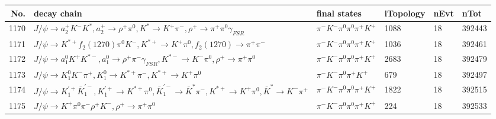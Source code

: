 \begin{table}[htbp] 
\begin{center}
\begin{small}
\begin{tabular}{rlllll}\hline\hline
 No. & decay chain & final states &  iTopology & nEvt & nTot \\\hline
1170&$J/\psi       \rightarrow a_{2}^{+}      K^{-}          K^{*}          , a_{2}^{+}       \rightarrow \rho^{+}      \pi^{0}        , K^{*}           \rightarrow K^{+}          \pi^{-}        , \rho^{+}       \rightarrow \pi^{+}        \pi^{0}        \gamma_{FSR} $&$\pi^{-}        K^{-}          \pi^{0}        \pi^{0}        \pi^{+}        K^{+}          $& 1088&   18&392443\\
1171&$J/\psi       \rightarrow K^{*+}         f_{2}(1270)    \pi^{0}        K^{-}          , K^{*+}          \rightarrow K^{+}          \pi^{0}        , f_{2}(1270)     \rightarrow \pi^{+}        \pi^{-}        $&$\pi^{-}        K^{-}          \pi^{0}        \pi^{0}        \pi^{+}        K^{+}          $& 1036&   18&392461\\
1172&$J/\psi       \rightarrow a_{1}^{0}      K^{+}          K^{*-}         , a_{1}^{0}       \rightarrow \rho^{+}      \pi^{-}        \gamma_{FSR} , K^{*-}          \rightarrow K^{-}          \pi^{0}        , \rho^{+}       \rightarrow \pi^{+}        \pi^{0}        $&$\pi^{-}        K^{-}          \pi^{0}        \pi^{0}        \pi^{+}        K^{+}          $& 2683&   18&392479\\
1173&$J/\psi       \rightarrow K_1^{0}        K^{-}          \pi^{+}        , K_1^{0}         \rightarrow K^{*+}         \pi^{-}        , K^{*+}          \rightarrow K^{+}          \pi^{0}        $&$\pi^{-}        K^{-}          \pi^{0}        \pi^{+}        K^{+}          $&  679&   18&392497\\
1174&$J/\psi       \rightarrow K_1^{'+}      \bar{K}_1^{'-}, K_1^{'+}       \rightarrow K^{*+}         \pi^{0}        , \bar{K}_1^{'-} \rightarrow \bar{K}^{*}   \pi^{-}        , K^{*+}          \rightarrow K^{+}          \pi^{0}        , \bar{K}^{*}    \rightarrow K^{-}          \pi^{+}        $&$\pi^{-}        K^{-}          \pi^{0}        \pi^{0}        \pi^{+}        K^{+}          $& 1822&   18&392515\\
1175&$J/\psi       \rightarrow K^{+}          \pi^{0}        \pi^{-}        \rho^{+}      K^{-}          , \rho^{+}       \rightarrow \pi^{+}        \pi^{0}        $&$\pi^{-}        K^{-}          \pi^{0}        \pi^{0}        \pi^{+}        K^{+}          $&  224&   18&392533\\

\end{tabular}
\end{small}
\end{center}
\end{table}
